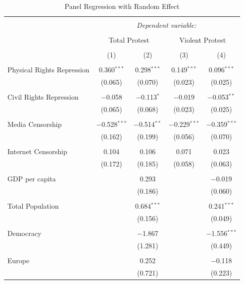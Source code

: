 \documentclass[11pt,]{article}
\begin{document}
\begin{table}[!htbp] \centering 
  \caption{Panel Regression with Random Effect} 
  \label{} 
\begin{tabular}{@{\extracolsep{5pt}}lcccc} 
\\[-1.8ex]\hline 
\hline \\[-1.8ex] 
 & \multicolumn{4}{c}{\textit{Dependent variable:}} \\ 
\cline{2-5} 
\\[-1.8ex] & \multicolumn{2}{c}{Total Protest} & \multicolumn{2}{c}{Violent Protest} \\ 
\\[-1.8ex] & (1) & (2) & (3) & (4)\\ 
\hline \\[-1.8ex] 
 Physical Rights Repression & 0.360$^{***}$ & 0.298$^{***}$ & 0.149$^{***}$ & 0.096$^{***}$ \\ 
  & (0.065) & (0.070) & (0.023) & (0.025) \\ 
  & & & & \\ 
 Civil Rights Repression & $-$0.058 & $-$0.113$^{*}$ & $-$0.019 & $-$0.053$^{**}$ \\ 
  & (0.065) & (0.068) & (0.023) & (0.025) \\ 
  & & & & \\ 
 Media Censorship & $-$0.528$^{***}$ & $-$0.514$^{**}$ & $-$0.229$^{***}$ & $-$0.359$^{***}$ \\ 
  & (0.162) & (0.199) & (0.056) & (0.070) \\ 
  & & & & \\ 
 Internet Censorship & 0.104 & 0.106 & 0.071 & 0.023 \\ 
  & (0.172) & (0.185) & (0.058) & (0.063) \\ 
  & & & & \\ 
 GDP per capita &  & 0.293 &  & $-$0.019 \\ 
  &  & (0.186) &  & (0.060) \\ 
  & & & & \\ 
 Total Population &  & 0.684$^{***}$ &  & 0.241$^{***}$ \\ 
  &  & (0.156) &  & (0.049) \\ 
  & & & & \\ 
 Democracy &  & $-$1.867 &  & $-$1.556$^{***}$ \\ 
  &  & (1.281) &  & (0.449) \\ 
  & & & & \\ 
 Europe &  & 0.252 &  & $-$0.118 \\ 
  &  & (0.721) &  & (0.223) \\ 

\end{tabular}
\end{table}
\end{document}
